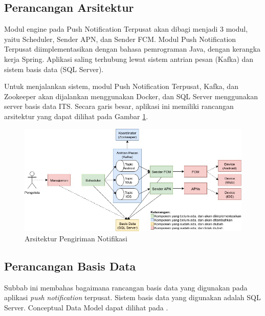 \subsection{Perancangan Arsitektur} \label{s:perancangan_arsitektur}
\par Modul engine pada Push Notification Terpusat akan dibagi menjadi 3 modul, yaitu Scheduler, Sender APN, dan Sender FCM. Modul Push Notification Terpusat diimplementasikan dengan bahasa pemrograman Java, dengan kerangka kerja Spring. Aplikasi saling terhubung lewat sistem antrian pesan (Kafka) dan sistem basis data (SQL Server).
\par Untuk menjalankan sistem, modul Push Notification Terpusat, Kafka, dan Zookeeper akan dijalankan menggunakan Docker, dan SQL Server menggunakan server basis data ITS. Secara garis besar, aplikasi ini memiliki rancangan arsitektur yang dapat dilihat pada Gambar \ref{img:arsitektur_baru}.
\begin{figure}[H]
    \includegraphics[width=1\textwidth]{bab3/img/arsitektur-push_notification_terpusat_baru.jpg}
    \caption{Arsitektur Pengiriman Notifikasi} \label{img:arsitektur_baru}
\end{figure}

\subsection{Perancangan Basis Data}
\par Subbab ini membahas bagaimana rancangan basis data yang digunakan pada aplikasi \textit{push notification} terpusat. Sistem basis data yang digunakan adalah SQL Server. Conceptual Data Model dapat dilihat pada .

